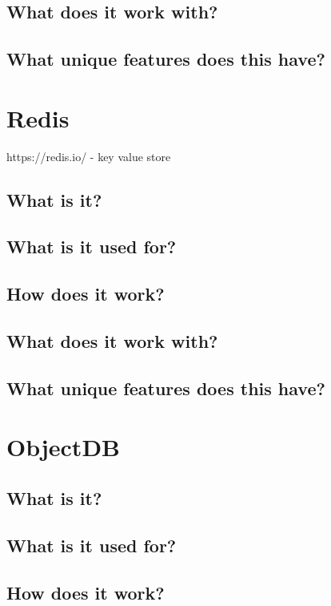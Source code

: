 \section{What does it work with?}

\section{What unique features does this have?}


\chapter{Redis}
https://redis.io/
- key value store

\section{What is it?}

\section{What is it used for?}

\section{How does it work?}

\section{What does it work with?}

\section{What unique features does this have?}


\chapter{ObjectDB}

\section{What is it?}

\section{What is it used for?}

\section{How does it work?}

